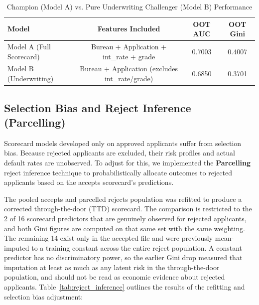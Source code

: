\documentclass[11pt,a4paper]{article}
\begin{document}
\begin{table}[H]
\centering
\small
\caption{Champion (Model A) vs. Pure Underwriting Challenger (Model B) Performance}
\label{tab:underwriting_comparison}
\vspace{0.5em}
\begin{tabular}{lccc}
\toprule
\textbf{Model} & \textbf{Features Included} & \textbf{OOT AUC} & \textbf{OOT Gini} \\
\midrule
Model A (Full Scorecard) & Bureau + Application + int\_rate + grade & 0.7003 & 0.4007 \\
Model B (Underwriting) & Bureau + Application (excludes int\_rate/grade) & 0.6850 & 0.3701 \\
\bottomrule
\end{tabular}
\end{table}

\subsection{Selection Bias and Reject Inference (Parcelling)}
Scorecard models developed only on approved applicants suffer from selection bias. Because rejected applicants are excluded, their risk profiles and actual default rates are unobserved. To adjust for this, we implemented the \textbf{Parcelling} reject inference technique to probabilistically allocate outcomes to rejected applicants based on the accepts scorecard's predictions.

The pooled accepts and parcelled rejects population was refitted to produce a corrected through-the-door (TTD) scorecard. The comparison is restricted to the 2 of 16 scorecard predictors that are genuinely observed for rejected applicants, and both Gini figures are computed on that same set with the same weighting. The remaining 14 exist only in the accepted file and were previously mean-imputed to a training constant across the entire reject population. A constant predictor has no discriminatory power, so the earlier Gini drop measured that imputation at least as much as any latent risk in the through-the-door population, and should not be read as economic evidence about rejected applicants. Table~\ref{tab:reject_inference} outlines the results of the refitting and selection bias adjustment:
\end{document}
